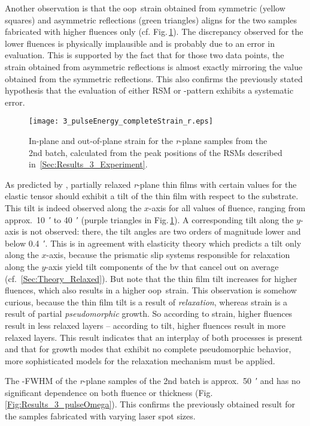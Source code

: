 Another observation is that the \gls{oop}\ strain obtained from symmetric (yellow squares) and asymmetric reflections (green triangles) aligns for the two samples fabricated with higher fluences only (cf. Fig.\,\ref{Fig:Results_3_pulse_r_StrainTilt}).
The discrepancy observed for the lower fluences is physically implausible and is probably due to an error in evaluation.
This is supported by the fact that for those two data points, the strain obtained from asymmetric reflections is almost exactly mirroring the value obtained from the symmetric reflections.
This also confirms the previously stated hypothesis that the evaluation of either \gls{RSM} or \thetaomega-pattern exhibits a systematic error.
\begin{figure}
    \centering
    \texttt{[image: 3\_pulseEnergy\_completeStrain\_r.eps]}
    \caption{
        In-plane and out-of-plane strain for the \textit{r}-plane samples from the 2nd batch, calculated from the peak positions of the \glspl{RSM} described in~\ref{Sec:Results_3_Experiment}.
    }
    \label{Fig:Results_3_pulse_r_StrainTilt}
\end{figure}

As predicted by \textcite{grundmann2020b}, partially relaxed \textit{r}-plane thin films with certain values for the elastic tensor should exhibit a tilt of the thin film with respect to the substrate.
This tilt is indeed observed along the $x$-axis for all values of fluence, ranging from approx.\ \qty{10}{\arcminute} to \qty{40}{\arcminute} (purple triangles in Fig.\,\ref{Fig:Results_3_pulse_r_StrainTilt}).
A corresponding tilt along the $y$-axis is not observed: there, the tilt angles are two orders of magnitude lower and below \qty{0.4}{\arcminute}.
This is in agreement with elasticity theory which predicts a tilt only along the $x$-axis, because the prismatic slip systems responsible for relaxation along the $y$-axis yield tilt components of the \gls{bv} that cancel out on average (cf.~\ref{Sec:Theory_Relaxed}).
But note that the thin film tilt increases for higher fluences, which also results in a higher \gls{oop}\ strain.
This observation is somehow curious, because the thin film tilt is a result of \emph{relaxation}, whereas strain is a result of partial \emph{pseudomorphic} growth.
So according to strain, higher fluences result in less relaxed layers -- according to tilt, higher fluences result in more relaxed layers.
This result indicates that an interplay of both processes is present and that for growth modes that exhibit no complete pseudomorphic behavior, more sophisticated models for the relaxation mechanism must be applied.

The \textomega-FWHM of the \textit{r}-plane samples of the 2nd batch is approx.\ \qty{50}{\arcminute} and has no significant dependence on both fluence or thickness (Fig.\,\ref{Fig:Results_3_pulseOmega}).
This confirms the previously obtained result for the samples fabricated with varying laser spot sizes.
